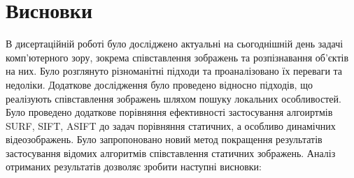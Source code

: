 \chapter*{Висновки}

В дисертаційній роботі було досліджено актуальні на сьогоднішній день задачі комп'ютерного зору, зокрема співставлення зображень та розпізнавання об'єктів на них. Було розглянуто різноманітні підходи та проаналізовано їх переваги та недоліки. Додаткове дослідження було проведено відносно підходів, що реалізують співставлення зображень шляхом пошуку локальних особливостей. Було проведено додаткове порівняння ефективності застосування алгоиртмів SURF, SIFT, ASIFT до задач порівняння статичних, а особливо динамічних відеозображень. Було запропоновано новий метод покращення результатів застосування відомих алгоритмів співставлення статичних зображень. Аналіз отриманих результатів дозволяє зробити наступні висновки:

